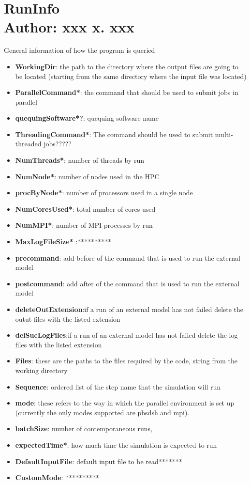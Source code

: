 \section{RunInfo  \\ \vspace{2 mm} {\small Author: xxx x. xxx}}

General information of how the program is queried
\begin{itemize}
\item  \textbf{WorkingDir}: the path to the directory where the output files are going to be located (starting from the same directory where the input file was located)
\item \textbf{ParallelCommand*}: the command that should be used to submit jobs in parallel
\item \textbf{quequingSoftware*?}: quequing software name
\item \textbf{ThreadingCommand*}: The command should be used to submit multi-threaded jobs?????
\item \textbf{NumThreads*}: number of threads by run
\item \textbf{NumNode*}: number of nodes used in the HPC 
\item \textbf{procByNode*}: number of processors used in a single node 
\item \textbf{NumCoresUsed*}: total number of cores used
\item \textbf{NumMPI*}: number of MPI processes by run
\item \textbf{MaxLogFileSize*} :**********
\item \textbf{precommand}: add before of the command that is used to run the external model
\item \textbf{postcommand}: add after of the command that is used to run the external model
\item \textbf{deleteOutExtension}:if a run of an external model has not failed delete the outut files with the listed extension
\item \textbf{delSucLogFiles}:if a run of an external model has not failed delete the log files with the listed extension
\item \textbf{Files}: these are the paths to the files required by the code, string from the working directory 
\item \textbf{Sequence}: ordered list of the step name that the simulation will run
\item \textbf{mode}: these refers to the way in which the parallel environment is set up (currently the only modes supported are pbsdsh and mpi).
\item \textbf{batchSize}: number of contemporaneous runs, 
\item \textbf{expectedTime*}: how much time the simulation is expected to run
\item \textbf{DefaultInputFile}: default input file to be read*******
\item \textbf{CustomMode}: **********
\end{itemize}
